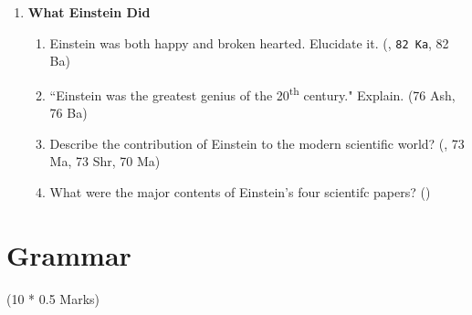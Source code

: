 \documentclass[12pt]{article}
\newcommand{\super}[1]{\textsuperscript{#1}}
\begin{document}
\begin{enumerate}
      \item \textbf{What Einstein Did}
      \begin{enumerate}
        \item Einstein was both happy and broken hearted. Elucidate it. \hfill (, \texttt{82 Ka}, 82 Ba)

        \item ``Einstein was the greatest genius of the 20\super{th} century." Explain. \hfill (76 Ash, 76 Ba)

        \item Describe the contribution of Einstein to the modern scientific world? \hfill (, 73 Ma, 73 Shr, 70 Ma)

        \item What were the major contents of Einstein's four scientifc papers? \hfill ()
      \end{enumerate}
    \end{enumerate}
\pagebreak

\section{Grammar}
  \begin{center}(10 * 0.5 Marks)\end{center}
\end{document}
